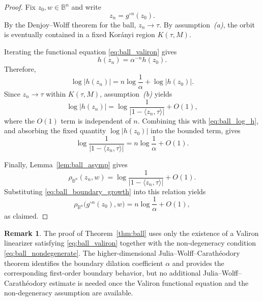 \documentclass[12pt]{amsart}
\numberwithin{equation}{section}
\theoremstyle{plain}
\theoremstyle{definition}
\newtheorem{remark}[equation]{Remark}
\begin{document}
\begin{proof}
Fix $z_0,w\in\mathbb B^n$ and write
\begin{equation*}
z_n=g^{\circ n}(z_0).
\end{equation*}
By the Denjoy--Wolff theorem for the ball,
$z_n\to\tau$. By assumption~\emph{(a)}, the orbit is eventually contained
in a fixed Kor\'anyi region $K(\tau,M)$.

Iterating the functional equation \eqref{eq:ball_valiron} gives
\begin{equation*}
\label{eq:ball_valiron_iterates}
h(z_n)
=
\alpha^{-n}h(z_0).
\end{equation*}
Therefore,
\begin{equation}
\label{eq:ball_log_h}
\log|h(z_n)|
=
n\log\frac1\alpha
+
\log|h(z_0)|.
\end{equation}
Since $z_n\to\tau$ within $K(\tau,M)$, assumption~\emph{(b)} yields
\begin{equation*}
\log|h(z_n)|
=
\log\frac{1}{|1-\langle z_n,\tau\rangle|}
+
O(1),
\end{equation*}
where the $O(1)$ term is independent of $n$. Combining this with
\eqref{eq:ball_log_h}, and absorbing the fixed quantity
$\log|h(z_0)|$ into the bounded term, gives
\begin{equation}
\label{eq:ball_boundary_growth}
\log\frac{1}{|1-\langle z_n,\tau\rangle|}
=
n\log\frac1\alpha
+
O(1).
\end{equation}

Finally, Lemma~\ref{lem:ball_asymp} gives
\begin{equation*}
\rho_{\mathbb B^n}(z_n,w)
=
\log\frac{1}{|1-\langle z_n,\tau\rangle|}
+
O(1).
\end{equation*}
Substituting \eqref{eq:ball_boundary_growth} into this relation yields
\begin{equation*}
\rho_{\mathbb B^n}
\bigl(g^{\circ n}(z_0),w\bigr)
=
n\log\frac1\alpha
+
O(1),
\end{equation*}
as claimed.
\end{proof}

\begin{remark}
The proof of Theorem~\ref{thm:ball} uses only the existence of a
Valiron linearizer satisfying \eqref{eq:ball_valiron} together with the
non-degeneracy condition \eqref{eq:ball_nondegenerate}. The
higher-dimensional Julia--Wolff--Carath\'eodory theorem identifies the
boundary dilation coefficient $\alpha$ and provides the corresponding
first-order boundary behavior, but no additional Julia--Wolff--Carath\'eodory
estimate is needed once the Valiron functional equation and the
non-degeneracy assumption are available.
\end{remark}
\end{document}

